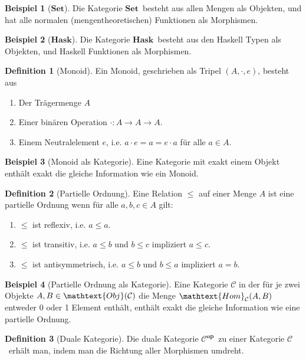 \documentclass[10pt,twoside,openright]{memoir}
\theoremstyle{definition}
\newtheorem{definition}{Definition}
\newtheorem{beispiel}{Beispiel}
\newcommand{\C}{\ensuremath{\mathcal{C}}}
\newcommand{\Obj}[1]{\ensuremath{\mathtext{Obj}(#1)}}
\newcommand{\Hom}[3]{\ensuremath{\mathtext{Hom}_{#1}(#2, #3)}}
\newcommand{\Set}{\ensuremath{\mathbf{Set}}}
\newcommand{\Hask}{\ensuremath{\mathbf{Hask}}}
\newcommand{\Op}[1]{\ensuremath{#1^{\mathbf{op}}}}
\begin{document}
\begin{beispiel}[\Set]
  Die Kategorie \Set\ besteht aus allen Mengen als Objekten, und hat alle normalen (mengentheoretischen) Funktionen als Morphismen.
\end{beispiel}

\begin{beispiel}[\Hask]
  Die Kategorie \Hask\ besteht aus den Haskell Typen als Objekten, und Haskell Funktionen als Morphismen.
\end{beispiel}

\begin{definition}[Monoid]
  Ein Monoid, geschrieben als Tripel $(A,\cdot, e)$, besteht aus
  \begin{enumerate}
  \item Der Trägermenge $A$
  \item Einer binären Operation $\cdot : A \to A \to A$.
  \item Einem Neutralelement $e$, i.e. $a \cdot e = a = e \cdot a$ für alle $a \in A$.
  \end{enumerate}
\end{definition}
\begin{beispiel}[Monoid als Kategorie]
  Eine Kategorie mit exakt einem Objekt enthält exakt die gleiche Information wie ein Monoid.
\end{beispiel}  

\begin{definition}[Partielle Ordnung]
  Eine Relation $\leq$ auf einer Menge $A$ ist eine partielle Ordnung wenn für alle $a,b,c \in A$ gilt:
  \begin{enumerate}
  \item $\leq$ ist reflexiv, i.e. $a \leq a$.
  \item $\leq$ ist transitiv, i.e. $a \leq b$ und $b \leq c$ impliziert $a \leq c$.
  \item $\leq$ ist antisymmetrisch, i.e. $a \leq b$ und $b \leq a$ impliziert $a = b$.
  \end{enumerate}
\end{definition}

\begin{beispiel}[Partielle Ordnung als Kategorie]
  Eine Kategorie $\C$ in der für je zwei Objekte $A, B \in \Obj{\C}$ die Menge \Hom{\C}{A}{B} entweder 0 oder 1 Element enthält, enthält exakt die gleiche Information wie eine partielle Ordnung.
\end{beispiel}

\begin{definition}[Duale Kategorie]
  Die duale Kategorie \Op{\C}\ zu einer Kategorie \C\ erhält man, indem man die Richtung aller Morphismen umdreht.
\end{definition}
\end{document}
